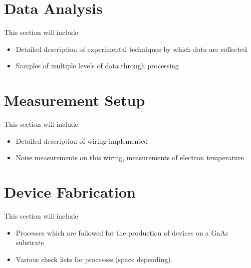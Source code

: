 \chapter{Data Analysis}
This section will include 
\begin{itemize}
\item Detailed description of experimental techniques by which data are collected
\item Samples of multiple levels of data through processing
\end{itemize}

\chapter{Measurement Setup}
This section will include 
\begin{itemize}
\item Detailed description of wiring implemented
\item Noise measurements on this wiring, measurements of electron temperature
\end{itemize}

\chapter{Device Fabrication}
This section will include 
\begin{itemize}
\item Processes which are followed for the production of devices on a GaAs substrate
\item Various check lists for processes (space depending).
\end{itemize}
